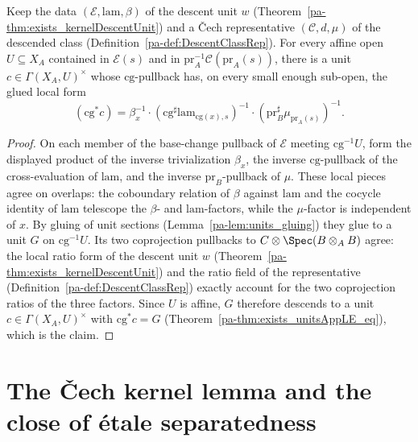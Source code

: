 \begin{theorem}
  \label{pa-thm:exists_kernelCobounding}
  \leanok

  Keep the data \((\mathcal E, \mathrm{lam}, \beta)\) of the descent unit \(w\)
  (Theorem~\ref{pa-thm:exists_kernelDescentUnit}) and a \v Cech representative \((\mathcal C, d,
  \mu)\) of the descended class (Definition~\ref{pa-def:DescentClassRep}).  For every affine open
  \(U \subseteq X_A\) contained in \(\mathcal E(s)\) and in \(\mathrm{pr}_A^{-1}\mathcal
  C(\mathrm{pr}_A(s))\), there is a unit \(c \in \Gamma(X_A, U)^{\times}\) whose
  \(\mathrm{cg}\)-pullback has, on every small enough sub-open, the glued local form
  \[
    (\mathrm{cg}^{*} c) = \beta_x^{-1} \cdot (\mathrm{cg}^{\sharp}\mathrm{lam}_{\mathrm{cg}(x),s})^{-1}
      \cdot (\mathrm{pr}_B^{\sharp}\mu_{\mathrm{pr}_A(s)})^{-1}.
  \]
\end{theorem}
\begin{proof}
  \leanok
  On each member of the base-change pullback of \(\mathcal E\) meeting \(\mathrm{cg}^{-1}U\),
  form the displayed product of the inverse trivialization \(\beta_x\), the inverse
  \(\mathrm{cg}\)-pullback of the cross-evaluation of \(\mathrm{lam}\), and the inverse
  \(\mathrm{pr}_B\)-pullback of \(\mu\).  These local pieces agree on overlaps: the coboundary
  relation of \(\beta\) against \(\mathrm{lam}\) and the cocycle identity of \(\mathrm{lam}\)
  telescope the \(\beta\)- and \(\mathrm{lam}\)-factors, while the \(\mu\)-factor is independent
  of \(x\).  By gluing of unit sections (Lemma~\ref{pa-lem:units_gluing}) they glue to a unit \(G\)
  on \(\mathrm{cg}^{-1}U\).  Its two coprojection pullbacks to \(C \otimes \Spec(B \otimes_A B)\)
  agree: the local ratio form of the descent unit \(w\)
  (Theorem~\ref{pa-thm:exists_kernelDescentUnit}) and the ratio field of the representative
  (Definition~\ref{pa-def:DescentClassRep}) exactly account for the two coprojection ratios of the
  three factors.  Since \(U\) is affine, \(G\) therefore descends to a unit \(c \in \Gamma(X_A,
  U)^{\times}\) with \(\mathrm{cg}^{*} c = G\) (Theorem~\ref{pa-thm:exists_unitsAppLE_eq}), which is
  the claim.
\end{proof}

\section{The \v Cech kernel lemma and the close of \'etale separatedness}
\label{pa-sec:cechKernelLemma}

